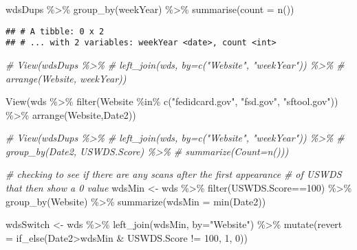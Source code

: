 \documentclass[
]{article}
\newenvironment{Shaded}{\begin{snugshade}}{\end{snugshade}}
\newcommand{\AttributeTok}[1]{\textcolor[rgb]{0.77,0.63,0.00}{#1}}
\newcommand{\CommentTok}[1]{\textcolor[rgb]{0.56,0.35,0.01}{\textit{#1}}}
\newcommand{\DecValTok}[1]{\textcolor[rgb]{0.00,0.00,0.81}{#1}}
\newcommand{\FunctionTok}[1]{\textcolor[rgb]{0.00,0.00,0.00}{#1}}
\newcommand{\NormalTok}[1]{#1}
\newcommand{\OtherTok}[1]{\textcolor[rgb]{0.56,0.35,0.01}{#1}}
\newcommand{\SpecialCharTok}[1]{\textcolor[rgb]{0.00,0.00,0.00}{#1}}
\newcommand{\StringTok}[1]{\textcolor[rgb]{0.31,0.60,0.02}{#1}}
\begin{document}
\begin{Shaded}
\begin{Highlighting}[]
\NormalTok{wdsDups }\SpecialCharTok{\%\textgreater{}\%} \FunctionTok{group\_by}\NormalTok{(weekYear) }\SpecialCharTok{\%\textgreater{}\%} \FunctionTok{summarise}\NormalTok{(}\AttributeTok{count =} \FunctionTok{n}\NormalTok{())}
\end{Highlighting}
\end{Shaded}

\begin{verbatim}
## # A tibble: 0 x 2
## # ... with 2 variables: weekYear <date>, count <int>
\end{verbatim}

\begin{Shaded}
\begin{Highlighting}[]
\CommentTok{\# View(wdsDups \%\textgreater{}\%}
\CommentTok{\#   left\_join(wds, by=c("Website", "weekYear")) \%\textgreater{}\%}
\CommentTok{\#   arrange(Website, weekYear))}

\FunctionTok{View}\NormalTok{(wds }\SpecialCharTok{\%\textgreater{}\%} 
  \FunctionTok{filter}\NormalTok{(Website }\SpecialCharTok{\%in\%} \FunctionTok{c}\NormalTok{(}\StringTok{"fedidcard.gov"}\NormalTok{, }\StringTok{"fsd.gov"}\NormalTok{, }\StringTok{"sftool.gov"}\NormalTok{)) }\SpecialCharTok{\%\textgreater{}\%}
  \FunctionTok{arrange}\NormalTok{(Website,Date2))}

\CommentTok{\# View(wdsDups \%\textgreater{}\%}
  \CommentTok{\# left\_join(wds, by=c("Website", "weekYear")) \%\textgreater{}\%}
  \CommentTok{\# group\_by(Date2, USWDS.Score) \%\textgreater{}\%}
  \CommentTok{\# summarize(Count=n()))}

\CommentTok{\# checking to see if there are any scans after the first appearance}
\CommentTok{\# of USWDS that then show a 0 value}
\NormalTok{wdsMin }\OtherTok{\textless{}{-}}\NormalTok{ wds }\SpecialCharTok{\%\textgreater{}\%}
  \FunctionTok{filter}\NormalTok{(USWDS.Score}\SpecialCharTok{==}\DecValTok{100}\NormalTok{) }\SpecialCharTok{\%\textgreater{}\%}
  \FunctionTok{group\_by}\NormalTok{(Website) }\SpecialCharTok{\%\textgreater{}\%}
  \FunctionTok{summarize}\NormalTok{(}\AttributeTok{wdsMin =} \FunctionTok{min}\NormalTok{(Date2))}

\NormalTok{wdsSwitch }\OtherTok{\textless{}{-}}\NormalTok{ wds }\SpecialCharTok{\%\textgreater{}\%}
  \FunctionTok{left\_join}\NormalTok{(wdsMin, }\AttributeTok{by=}\StringTok{"Website"}\NormalTok{) }\SpecialCharTok{\%\textgreater{}\%}
  \FunctionTok{mutate}\NormalTok{(}\AttributeTok{revert =} \FunctionTok{if\_else}\NormalTok{(Date2}\SpecialCharTok{\textgreater{}}\NormalTok{wdsMin }\SpecialCharTok{\&}\NormalTok{ USWDS.Score }\SpecialCharTok{!=} \DecValTok{100}\NormalTok{, }\DecValTok{1}\NormalTok{, }\DecValTok{0}\NormalTok{))}


\end{Highlighting}
\end{Shaded}
\end{document}
